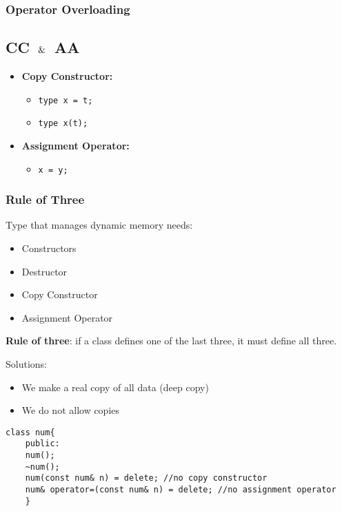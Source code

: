 \subsubsection{Operator Overloading}

\subsection{CC $\And$ AA}
\begin{itemize}
    \item \textbf{Copy Constructor:}
    \begin{itemize}
        \item \texttt{type x = t;}
        \item \texttt{type x(t);}
    \end{itemize}

    \item \textbf{Assignment Operator:}
    \begin{itemize}
        \item \texttt{x = y;}
    \end{itemize}

    
\end{itemize}
\subsubsection{Rule of Three}
Type that manages dynamic memory needs:
\begin{itemize}
    \item Constructors
    \item Destructor
    \item Copy Constructor
    \item Assignment Operator
\end{itemize}

\textbf{Rule of three}:
if a class defines one of the last three, it must define all three.

Solutions:
\begin{itemize}
    \item We make a real copy of all data (deep copy)
    \item We do not allow copies
\end{itemize}

\begin{lstlisting}[style=codeexpert]
    class num{
    public:
    num();
    ~num();
    num(const num& n) = delete; //no copy constructor
    num& operator=(const num& n) = delete; //no assignment operator
    }
\end{lstlisting}


